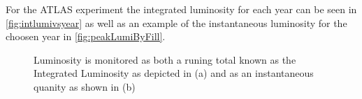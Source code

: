 For the ATLAS experiment the integrated luminosity for each year can be seen in
\cref{fig:intlumivsyear} as well as an example of the instantaneous luminosity for the choosen
year in \cref{fig:peakLumiByFill}.

\begin{figure}[!htbp] 
\centering
{}\hfill
{}\hfill
\caption{Luminosity is monitored as both a runing total known as the Integrated
Luminosity as depicted in (a) and as an instantaneous quanity as shown in (b)}
\label{fig:luminosity} 
\end{figure}

